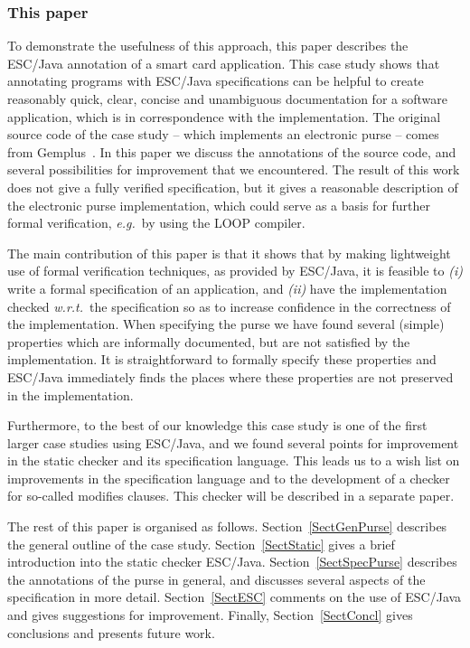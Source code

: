 \documentclass[a4paper]{llncs}
\begin{document}
\subsubsection{This paper}
To demonstrate the usefulness of this approach, this paper describes
the ESC/Java annotation of a smart card application. This case study
shows that annotating programs with ESC/Java specifications can be
helpful to create reasonably quick, clear, concise and unambiguous
documentation for a software application, which is in correspondence
with the implementation.  The original source code of the case study
-- which implements an electronic purse -- comes from
Gemplus~\cite{PurseUrl}. In this paper we discuss the annotations of
the source code, and several possibilities for improvement that we
encountered.  The result of this work does not give a fully verified
specification, but it gives a reasonable description of the electronic
purse implementation, which could serve as a basis for further formal
verification, \emph{e.g.}~by using the LOOP compiler.

The main contribution of this paper is that it shows that by making
light\-weight use of formal verification techniques, as provided by
ESC/Java, it is feasible to
\emph{(i)} write a formal specification of an application, and
\emph{(ii)} have the implementation checked \emph{w.r.t.}~the 
specification so as to increase confidence in the correctness of the
implementation. When specifying the purse we have found several
(simple) properties which are informally documented, but are not
satisfied by the implementation. It is straightforward to formally
specify these properties and ESC/Java immediately finds the places
where these properties are not preserved in the implementation.

Furthermore, to the best of our knowledge this case study is one of
the first larger case studies using ESC/Java, and we found
several points for improvement in the static checker and its
specification language. This leads us to a wish list on improvements in
the specification language and to the development of a checker for
so-called modifies clauses. This checker will be described in a
separate paper.%

The rest of this paper is organised as
follows. Section~\ref{SectGenPurse} describes the general outline of
the case study. Section~\ref{SectStatic} gives a brief introduction
into the static checker ESC/Java.  Section~\ref{SectSpecPurse}
describes the annotations of the purse in general, and discusses
several aspects of the specification in more
detail. Section~\ref{SectESC} comments on the use of ESC/Java and
gives suggestions for improvement. Finally, Section~\ref{SectConcl}
gives conclusions and presents future work.
\end{document}
